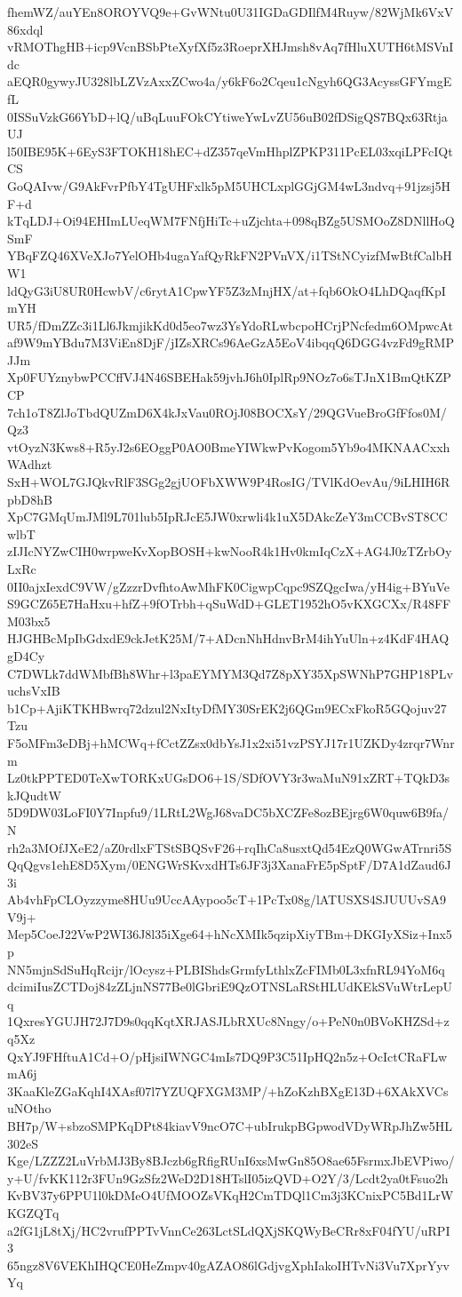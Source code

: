 fhemWZ/auYEn8OROYVQ9e+GvWNtu0U31IGDaGDIlfM4Ruyw/82WjMk6VxV86xdql
vRMOThgHB+icp9VcnBSbPteXyfXf5z3RoeprXHJmsh8vAq7fHluXUTH6tMSVnIdc
aEQR0gywyJU328lbLZVzAxxZCwo4a/y6kF6o2Cqeu1cNgyh6QG3AcyssGFYmgEfL
0ISSuVzkG66YbD+lQ/uBqLuuFOkCYtiweYwLvZU56uB02fDSigQS7BQx63RtjaUJ
l50IBE95K+6EyS3FTOKH18hEC+dZ357qeVmHhplZPKP311PcEL03xqiLPFcIQtCS
GoQAIvw/G9AkFvrPfbY4TgUHFxlk5pM5UHCLxplGGjGM4wL3ndvq+91jzsj5HF+d
kTqLDJ+Oi94EHImLUeqWM7FNfjHiTc+uZjchta+098qBZg5USMOoZ8DNllHoQSmF
YBqFZQ46XVeXJo7YelOHb4ugaYafQyRkFN2PVnVX/i1TStNCyizfMwBtfCalbHW1
ldQyG3iU8UR0HcwbV/c6rytA1CpwYF5Z3zMnjHX/at+fqb6OkO4LhDQaqfKpImYH
UR5/fDmZZc3i1Ll6JkmjikKd0d5eo7wz3YsYdoRLwbcpoHCrjPNcfedm6OMpwcAt
af9W9mYBdu7M3ViEn8DjF/jIZsXRCs96AeGzA5EoV4ibqqQ6DGG4vzFd9gRMPJJm
Xp0FUYznybwPCCffVJ4N46SBEHak59jvhJ6h0IplRp9NOz7o6sTJnX1BmQtKZPCP
7ch1oT8ZlJoTbdQUZmD6X4kJxVau0ROjJ08BOCXsY/29QGVueBroGfFfos0M/Qz3
vtOyzN3Kws8+R5yJ2s6EOggP0AO0BmeYIWkwPvKogom5Yb9o4MKNAACxxhWAdhzt
SxH+WOL7GJQkvRlF3SGg2gjUOFbXWW9P4RosIG/TVlKdOevAu/9iLHIH6RpbD8hB
XpC7GMqUmJMl9L701lub5IpRJcE5JW0xrwli4k1uX5DAkcZeY3mCCBvST8CCwlbT
zIJIcNYZwCIH0wrpweKvXopBOSH+kwNooR4k1Hv0kmIqCzX+AG4J0zTZrbOyLxRc
0II0ajxIexdC9VW/gZzzrDvfhtoAwMhFK0CigwpCqpc9SZQgcIwa/yH4ig+BYuVe
S9GCZ65E7HaHxu+hfZ+9fOTrbh+qSuWdD+GLET1952hO5vKXGCXx/R48FFM03bx5
HJGHBcMpIbGdxdE9ckJetK25M/7+ADcnNhHdnvBrM4ihYuUln+z4KdF4HAQgD4Cy
C7DWLk7ddWMbfBh8Whr+l3paEYMYM3Qd7Z8pXY35XpSWNhP7GHP18PLvuchsVxIB
b1Cp+AjiKTKHBwrq72dzul2NxItyDfMY30SrEK2j6QGm9ECxFkoR5GQojuv27Tzu
F5oMFm3eDBj+hMCWq+fCctZZsx0dbYsJ1x2xi51vzPSYJ17r1UZKDy4zrqr7Wnrm
Lz0tkPPTED0TeXwTORKxUGsDO6+1S/SDfOVY3r3waMuN91xZRT+TQkD3skJQudtW
5D9DW03LoFI0Y7Inpfu9/1LRtL2WgJ68vaDC5bXCZFe8ozBEjrg6W0quw6B9fa/N
rh2a3MOfJXeE2/aZ0rdlxFTStSBQSvF26+rqIhCa8usxtQd54EzQ0WGwATrnri5S
QqQgvs1ehE8D5Xym/0ENGWrSKvxdHTs6JF3j3XanaFrE5pSptF/D7A1dZaud6J3i
Ab4vhFpCLOyzzyme8HUu9UccAAypoo5cT+1PcTx08g/lATUSXS4SJUUUvSA9V9j+
Mep5CoeJ22VwP2WI36J8l35iXge64+hNcXMIk5qzipXiyTBm+DKGIyXSiz+Inx5p
NN5mjnSdSuHqRcijr/lOcysz+PLBIShdsGrmfyLthlxZcFIMb0L3xfnRL94YoM6q
dcimiIusZCTDoj84zZLjnNS77Be0lGbriE9QzOTNSLaRStHLUdKEkSVuWtrLepUq
1QxresYGUJH72J7D9s0qqKqtXRJASJLbRXUc8Nngy/o+PeN0n0BVoKHZSd+zq5Xz
QxYJ9FHftuA1Cd+O/pHjsiIWNGC4mIs7DQ9P3C51IpHQ2n5z+OcIctCRaFLwmA6j
3KaaKleZGaKqhI4XAsf07l7YZUQFXGM3MP/+hZoKzhBXgE13D+6XAkXVCsuNOtho
BH7p/W+sbzoSMPKqDPt84kiavV9ncO7C+ubIrukpBGpwodVDyWRpJhZw5HL302eS
Kge/LZZZ2LuVrbMJ3By8BJczb6gRfigRUnI6xsMwGn85O8ae65FsrmxJbEVPiwo/
y+U/fvKK112r3FUn9GzSfz2WeD2D18HTslI05izQVD+O2Y/3/Lcdt2ya0tFsuo2h
KvBV37y6PPU1l0kDMeO4UfMOOZsVKqH2CmTDQl1Cm3j3KCnixPC5Bd1LrWKGZQTq
a2fG1jL8tXj/HC2vrufPPTvVnnCe263LctSLdQXjSKQWyBeCRr8xF04fYU/uRPI3
65ngz8V6VEKhIHQCE0HeZmpv40gAZAO86lGdjvgXphIakoIHTvNi3Vu7XprYyvYq
